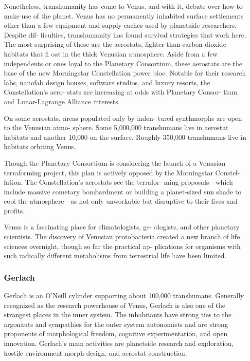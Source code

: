 Nonetheless, transhumanity has come to Venus, 
and with it, debate over how to make use of the 
planet. Venus has no permanently inhabited surface 
settlements other than a few equipment and supply 
caches used by planetside researchers. Despite dif-
ficulties, transhumanity has found survival strategies 
that work here. The most surprising of these are the 
aerostats, lighter-than-carbon dioxide habitats that 
fl oat in the thick Venusian atmosphere. Aside from 
a few independents or ones loyal to the Planetary 
Consortium, these aerostats are the base of the new 
Morningstar Constellation power bloc. Notable for 
their research labs, nanofab design houses, software 
studios, and luxury resorts, the Constellation's aero-
stats are increasing at odds with Planetary Consor-
tium and Lunar-Lagrange Alliance interests.

On some aerostats, areas populated only by inden-
tured synthmorphs are open to the Venusian atmo-
sphere. Some 5,000,000 transhumans live in aerostat 
habitats and another 10,000 on the surface. Roughly 
350,000 transhumans live in habitats orbiting Venus.

Though the Planetary Consortium is considering 
the launch of a Venusian terraforming project, this 
plan is actively opposed by the Morningstar Constel-
lation. The Constellation's aerostats see the terrafor-
ming proposals—which include massive cometary 
bombardment or building a planet-sized sun shade 
to cool the atmosphere—as not only unworkable but 
disruptive to their lives and profits.

Venus is a fascinating place for climatologists, ge-
ologists, and other planetary scientists. The discovery 
of Venusian protobacteria created a new branch of 
life sciences overnight, though so far the practical ap-
plications for organisms with such radically different 
metabolisms from terrestrial life have been limited.

\subsubsection{Gerlach}

Gerlach is an O'Neill cylinder supporting about 
100,000 transhumans. Generally recognized as 
the research powerhouse of Venus, Gerlach is also 
one of the strangest places in the inner system. The 
inhabitants have strong ties to the argonauts and 
sympathies for the outer system autonomists and 
are strong proponents of morphological freedom, 
cognitive experimentation, and open innovation. 
Gerlach's main activities are planetside research and 
exploration, hostile environment morph design, and 
aerostat construction.

